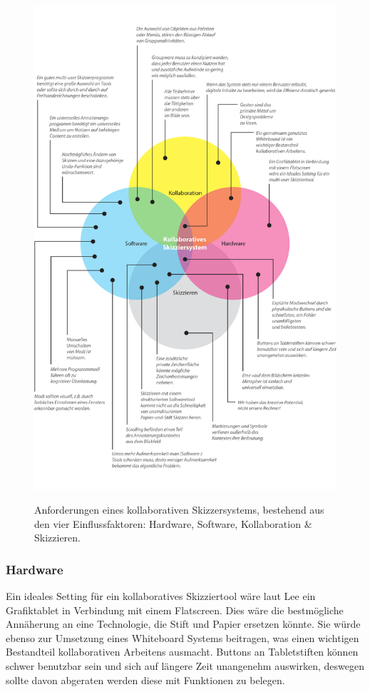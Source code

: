 \begin{figure}
	        {\includegraphics[bb=0cm 0cm 14.39cm 23.01cm]{gfx/scribblerKollaborativesSkizziersystem}}
		\caption[Anforderungen eines kollaborativen Skizzersystems]{Anforderungen eines kollaborativen Skizzersystems, bestehend aus den vier Einflussfaktoren: Hardware, Software, Kollaboration \& Skizzieren.}\label{fig:scribblerKollaborativesSkizziersystem}
\end{figure}

\subsubsection*{Hardware} Ein ideales Setting für ein kollaboratives Skizziertool wäre laut Lee ein Grafiktablet in Verbindung mit einem Flatscreen. Dies wäre die bestmögliche Annäherung an eine Technologie, die Stift und Papier ersetzen könnte. Sie würde ebenso zur Umsetzung eines Whiteboard Systems beitragen, was einen wichtigen Bestandteil kollaborativen Arbeitens ausmacht. Buttons an Tabletstiften können schwer benutzbar sein und sich auf längere Zeit unangenehm auswirken, deswegen sollte davon abgeraten werden diese mit Funktionen zu belegen. 

